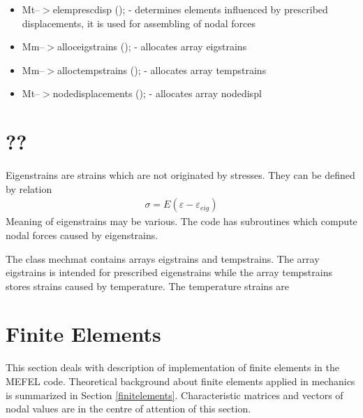 \begin{itemize}
\item
Mt--$>$elemprescdisp (); - determines elements influenced by prescribed
displacements, it is used for assembling of nodal forces


\item
Mm--$>$alloceigstrains (); - allocates array eigstrains 

\item
Mm--$>$alloctempstrains (); - allocates array tempstrains

\item
Mt--$>$nodedisplacements (); - allocates array nodedispl





\end{itemize}



\section{??}

Eigenstrains are strains which are not originated by stresses.
They can be defined by relation
\begin{eqnarray}
\sigma = E (\varepsilon - \varepsilon_{eig})
\end{eqnarray}
Meaning of eigenstrains may be various. The code has subroutines
which compute nodal forces caused by eigenstrains.

The class mechmat contains arrays eigstrains and tempstrains.
The array eigstrains is intended for prescribed eigenstrains
while the array tempstrains stores strains caused by temperature.
The temperature strains are



\section{Finite Elements}

This section deals with description of implementation of finite elements in the MEFEL code.
Theoretical background about finite elements applied in mechanics is summarized in
Section \ref{finitelements}. Characteristic matrices and vectors of nodal values are in the
centre of attention of this section.

